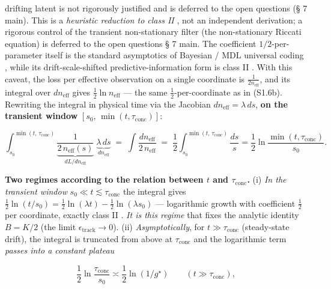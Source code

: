 \documentclass[12pt]{iopart}
\begin{document}
drifting latent is not rigorously justified and is deferred to the open questions (§ 7 main). This is a \emph{heuristic reduction to class II} \cite{BialekNemenmanTishby2001}, not an independent derivation; a rigorous control of the transient non-stationary filter (the non-stationary Riccati equation) is deferred to the open questions § 7 main. The coefficient \(1/2\)-per-parameter itself is the standard asymptotics of Bayesian / MDL universal coding \cite{ClarkeBarron1990,Rissanen1986,Schwarz1978}, while its drift-scale-shifted predictive-information form is class II \cite{BialekNemenmanTishby2001}. With this caveat, the loss per effective observation on a single coordinate is \(\tfrac{1}{2n_{\text{eff}}}\), and its integral over \(dn_{\text{eff}}\) gives \(\tfrac12\ln n_{\text{eff}}\) --- the same \(\tfrac12\)-per-coordinate as in (S1.6b). Rewriting the integral in physical time via the Jacobian \(dn_{\text{eff}}=\lambda\,ds\), \textbf{on the transient window} \([s_0,\,\min(t,\tau_{\text{conc}})]\):



\begin{equation}\int_{s_0}^{\min(t,\,\tau_{\text{conc}})} \underbrace{\frac{1}{2\,n_{\text{eff}}(s)}}_{dL/dn_{\text{eff}}}\;\underbrace{\lambda\,ds}_{dn_{\text{eff}}} \;=\; \int \frac{dn_{\text{eff}}}{2\,n_{\text{eff}}} \;=\; \frac12\int_{s_0}^{\min(t,\,\tau_{\text{conc}})}\frac{ds}{s} = \frac12\ln\frac{\min(t,\tau_{\text{conc}})}{s_0}. \tag{S1.8}\end{equation}



\textbf{Two regimes according to the relation between \(t\) and \(\tau_{\text{conc}}\).} (i) \emph{In the transient window} \(s_0 \ll t \lesssim \tau_{\text{conc}}\) the integral gives \(\tfrac12\ln(t/s_0) = \tfrac12\ln(\lambda t) - \tfrac12\ln(\lambda s_0)\) --- logarithmic growth with coefficient \(\tfrac12\) per coordinate, exactly class II \cite{BialekNemenmanTishby2001}. \emph{It is this regime} that fixes the analytic identity \(B = K/2\) (the limit \(\epsilon_{\text{track}}\to 0\)). (ii) \emph{Asymptotically}, for \(t \gg \tau_{\text{conc}}\) (steady-state drift), the integral is truncated from above at \(\tau_{\text{conc}}\) and the logarithmic term \emph{passes into a constant plateau}



\begin{equation}\frac12\ln\frac{\tau_{\text{conc}}}{s_0} \asymp \frac12\ln(1/g^\star) \qquad (t \gg \tau_{\text{conc}}), \tag{S1.8a}\end{equation}
\end{document}
